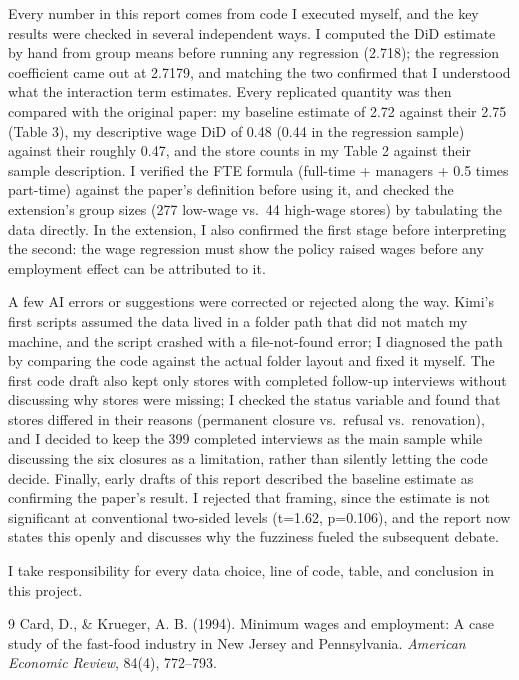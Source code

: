 \documentclass[11pt]{article}
\begin{document}
Every number in this report comes from code I executed myself, and the key results were checked in several independent ways. I computed the DiD estimate by hand from group means before running any regression (2.718); the regression coefficient came out at 2.7179, and matching the two confirmed that I understood what the interaction term estimates. Every replicated quantity was then compared with the original paper: my baseline estimate of 2.72 against their 2.75 (Table 3), my descriptive wage DiD of 0.48 (0.44 in the regression sample) against their roughly 0.47, and the store counts in my Table 2 against their sample description. I verified the FTE formula (full-time + managers + 0.5 times part-time) against the paper's definition before using it, and checked the extension's group sizes (277 low-wage vs.\ 44 high-wage stores) by tabulating the data directly. In the extension, I also confirmed the first stage before interpreting the second: the wage regression must show the policy raised wages before any employment effect can be attributed to it.

A few AI errors or suggestions were corrected or rejected along the way. Kimi's first scripts assumed the data lived in a folder path that did not match my machine, and the script crashed with a file-not-found error; I diagnosed the path by comparing the code against the actual folder layout and fixed it myself. The first code draft also kept only stores with completed follow-up interviews without discussing why stores were missing; I checked the status variable and found that stores differed in their reasons (permanent closure vs.\ refusal vs.\ renovation), and I decided to keep the 399 completed interviews as the main sample while discussing the six closures as a limitation, rather than silently letting the code decide. Finally, early drafts of this report described the baseline estimate as confirming the paper's result. I rejected that framing, since the estimate is not significant at conventional two-sided levels (t=1.62, p=0.106), and the report now states this openly and discusses why the fuzziness fueled the subsequent debate.

I take responsibility for every data choice, line of code, table, and conclusion in this project.

\begin{thebibliography}{9}
Card, D., \& Krueger, A. B. (1994).
Minimum wages and employment: A case study of the fast-food industry in New Jersey and Pennsylvania.
\emph{American Economic Review}, 84(4), 772--793.
\end{thebibliography}
\end{document}
